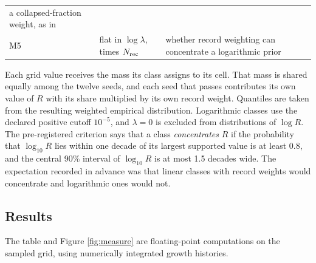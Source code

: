 \begin{longtable}[]{@{}lll@{}}
\begin{minipage}[t]{0.62\columnwidth}
a collapsed-fraction weight, as in
\citep{MartelShapiroWeinberg1998}\strut
\end{minipage}\tabularnewline
\begin{minipage}[t]{0.07\columnwidth}\raggedright
M5\strut
\end{minipage} & \begin{minipage}[t]{0.22\columnwidth}\raggedright
flat in \(\log\lambda\), times \(N_{\rm rec}\)\strut
\end{minipage} & \begin{minipage}[t]{0.62\columnwidth}\raggedright
whether record weighting can concentrate a logarithmic prior\strut
\end{minipage}\tabularnewline
\bottomrule
\end{longtable}
\addtocounter{table}{-1}

Each grid value receives the mass its class assigns to its cell. That
mass is shared equally among the twelve seeds, and each seed that passes
contributes its own value of \(R\) with its share multiplied by its own
record weight. Quantiles are taken from the resulting weighted empirical
distribution. Logarithmic classes use the declared positive cutoff
\(10^{-5}\), and \(\lambda=0\) is excluded from distributions of
\(\log R\). The pre-registered criterion says that a class
\emph{concentrates} \(R\) if the probability that \(\log_{10}R\) lies
within one decade of its largest supported value is at least \(0.8\),
and the central 90\% interval of \(\log_{10}R\) is at most 1.5 decades
wide. The expectation recorded in advance was that linear classes with
record weights would concentrate and logarithmic ones would not.

\hypertarget{results}{%
\subsection{Results}\label{results}}

The table and Figure \ref{fig:measure} are floating-point computations
on the sampled grid, using numerically integrated growth histories.

